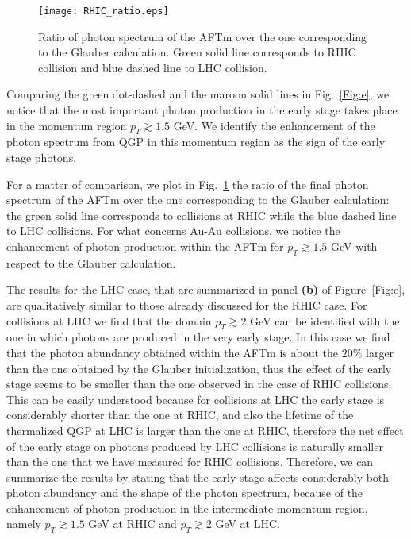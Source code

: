 \documentclass[aps,prc,a4paper,nofootinbib,
preprintnumbers,superscriptaddress,twocolumn,showpacs,showkeys]{revtex4}
\begin{document}
 
\begin{figure}[t!]
\begin{center}
\texttt{[image: RHIC\_ratio.eps]}
\caption{\label{Fig:f}Ratio of photon spectrum of the AFTm over the one corresponding
to the Glauber calculation. Green solid line corresponds to RHIC collision and blue dashed line
to LHC collision.}
\end{center}
\end{figure} 
 
Comparing the green dot-dashed and the maroon solid lines in Fig.~\ref{Fig:e}, 
we notice that the most important photon production in the early stage
takes place in the momentum region
$p_T \gtrsim 1.5$ GeV. 
We identify the enhancement of the photon spectrum from QGP
in this momentum region as the sign of the early stage photons.

For a matter of comparison, 
we plot in Fig.~\ref{Fig:f} the ratio of the final photon spectrum of the AFTm over
the one corresponding to the Glauber calculation: the green solid line corresponds to 
collisions at RHIC while the blue dashed line to LHC collisions.
For what concerns Au-Au collisions, we notice the
enhancement of photon production within the AFTm for 
$p_T \gtrsim 1.5$ GeV with respect to the Glauber calculation.




The results for the LHC case, that are summarized in panel {\bf (b)} of Figure~\ref{Fig:e},
are qualitatively similar to those already discussed for the RHIC case. For collisions
at LHC we find that the domain $p_T \gtrsim 2$ GeV can be identified with the one in which
photons are produced in the very early stage. In this case we find that the photon abundancy
obtained within the AFTm is about the $20\%$ larger than the one obtained by the Glauber initialization,
thus the effect of the early stage seems to be smaller than the one observed in the case of RHIC collisions.
This can be easily understood because for collisions at LHC the early stage is considerably shorter than the
one at RHIC, and also the lifetime of the thermalized QGP at LHC is larger than the one at RHIC,
therefore the net effect of the early stage on photons produced by LHC collisions
is naturally smaller than the one that we have measured for RHIC collisions.
Therefore, we can summarize the results by stating that the early stage
affects considerably both photon abundancy and the shape of the photon spectrum,
because of the enhancement of photon production in the intermediate momentum region, 
namely $p_T \gtrsim 1.5$ GeV at RHIC and $p_T \gtrsim 2$ GeV at LHC.
\end{document}
